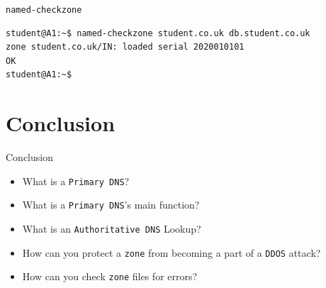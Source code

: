 \documentclass[xcolor=table]{beamer}
\begin{document}
\begin{frame}[fragile]{\texttt{named-checkzone}}
  \begin{tcolorbox}
    \lstset{
      basicstyle=\tiny\ttfamily,
    }
    \begin{lstlisting}
student@A1:~$ named-checkzone student.co.uk db.student.co.uk
zone student.co.uk/IN: loaded serial 2020010101
OK
student@A1:~$
    \end{lstlisting}
  \end{tcolorbox}
\end{frame}

\section*{Conclusion}
\begin{frame}{Conclusion}
  \begin{itemize}
    \item What is a \texttt{Primary DNS}?
    \item What is a \texttt{Primary DNS}’s main function?
    \item What is an \texttt{Authoritative DNS} Lookup?
    \item How can you protect a \texttt{zone} from becoming a part of a \texttt{DDOS} attack?
    \item How can you check \texttt{zone} files for errors?
  \end{itemize}
\end{frame}
\end{document}
